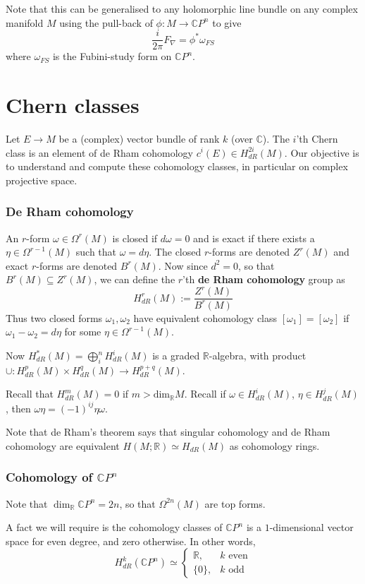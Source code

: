 \documentclass[a4paper]{article}
\theoremstyle{definition} \newtheorem*{definition}{Definition}
\theoremstyle{definition} \newtheorem*{definitions}{Definitions}
\theoremstyle{plain} \newtheorem{theorem}{Theorem}[section]
\theoremstyle{plain} \newtheorem{proposition}[theorem]{Proposition}
\theoremstyle{plain} \newtheorem{corollary}[theorem]{Corollary}
\theoremstyle{plain} \newtheorem{lemma}[theorem]{Lemma}
\theoremstyle{plain} \newtheorem{example}[theorem]{Example}
\newcommand{\defn}[1]{\textbf{#1}}
\newcommand{\realnos}{\mathbb{R}}
\newcommand{\complexnos}{\mathbb{C}}
\begin{document}
Note that this can be generalised to any holomorphic line bundle on any complex manifold $M$ using the pull-back of $\phi:M\to \complexnos P^n$ to give
$$\frac{i}{2\pi}F_\nabla = \phi^* \omega_{FS}$$
where $\omega_{FS}$ is the Fubini-study form on $\complexnos P^n$.

\section{Chern classes}
Let $E\to M$ be a (complex) vector bundle of rank $k$ (over $\complexnos$). The $i$'th Chern class is an element of de Rham cohomology
$c^i(E)\in H^{2i}_{dR}(M)$. Our objective is to understand and compute these cohomology classes, in particular on complex projective space.

\subsubsection{De Rham cohomology}
An $r$-form $\omega\in \Omega^r(M)$ is closed if $d\omega=0$ and is exact if there exists a $\eta \in \Omega^{r-1}(M)$ such that $\omega = d\eta$. The closed $r$-forms are denoted $Z^r(M)$ and exact $r$-forms are denoted $B^r(M)$. Now since $d^2=0$, so that $B^r(M)\subseteq Z^r(M)$, we can define the $r$'th \defn{de Rham cohomology} group as 
$$H_{dR}^r(M):=\frac{Z^r(M)}{B^r(M)}$$
Thus two closed forms $\omega_1, \omega_2$ have equivalent cohomology class $[\omega_1]=[\omega_2]$ if $\omega_1 - \omega_2 = d\eta$ for some $\eta \in \Omega^{r-1}(M)$. 

Now $H^*_{dR}(M) = \bigoplus_i^n H^i_{dR}(M)$ is a graded $\realnos$-algebra, with product $\cup:H^p_{dR}(M)\times H^q_{dR}(M)\to H^{p+q}_{dR}(M)$. 

Recall that $H^m_{dR}(M)=0$ if $m>\text{dim}_\realnos M$. Recall if $\omega \in H^{i}_{dR}(M)$, $\eta \in H^{j}_{dR}(M)$, then $\omega \eta = (-1)^{ij} \eta \omega$.

Note that de Rham's theorem says that singular cohomology and de Rham cohomology are equivalent $H(M; \realnos)\simeq H_{dR}(M)$ as cohomology rings.

\subsubsection{Cohomology of $\complexnos P^n$}
Note that $\dim_\realnos \complexnos P^n = 2n$, so that $\Omega^{2n}(M)$ are top forms.  

A fact we will require is the cohomology classes of $\complexnos P^n$ is a $1$-dimensional vector space for even degree, and zero otherwise. In other words,
$$H^k_{dR}(\complexnos P^n)\simeq \begin{cases}
\realnos, &  k \text{ even} \\ 
\{0\}, & k \text{ odd}
\end{cases}$$
\end{document}
